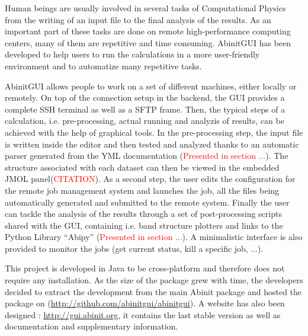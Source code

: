 Human beings are usually involved in several tasks of Computational Physics 
from the writing of an input file to the final analysis of the results. As an 
important part of these tasks are done on remote high-performance 
computing centers, many of them are repetitive and time consuming.
AbinitGUI has been developed to help users to run the calculations in a more 
user-friendly environment and to automatize many repetitive tasks.

AbinitGUI allows people to work on a set of different machines, either locally 
or remotely. On top of the connection setup in the backend, the GUI provides a 
complete SSH terminal as well as a SFTP frame. Then, the typical steps of a 
calculation, i.e. pre-processing, actual running and analyzis of results, can 
be achieved with the help of graphical tools. In the pre-processing 
step, the input file is written inside the editor and then tested and 
analyzed thanks to an automatic parser generated from the YML documentation 
(\textcolor{red}{Presented in section ...}). The structure associated with 
each dataset can then be viewed in the embedded JMOL 
panel(\textcolor{red}{CITATION}).
As a second step, the user edits the configuration for the remote job 
management system and launches the job, all the files being automatically 
generated and submitted to the remote system.
Finally the user can tackle the analysis of the results through a 
set of post-processing scripts shared with the GUI, containing i.e. band 
structure plotters and links to the Python Library ``Abipy'' 
(\textcolor{red}{Presented in section ...}). 
A minimalistic interface is also provided to monitor the jobs (get 
current status, kill a specific job, ...).

This project is developed in Java to be cross-platform and therefore does not 
require any installation. As the size of the package grew with time, the 
developers decided to extract the development from the main Abinit package and 
hosted the package on (\url{http://github.com/abinitgui/abinitgui}). A website 
has also been designed : \url{http://gui.abinit.org}, it contains the last 
stable version as well as documentation and supplementary information.